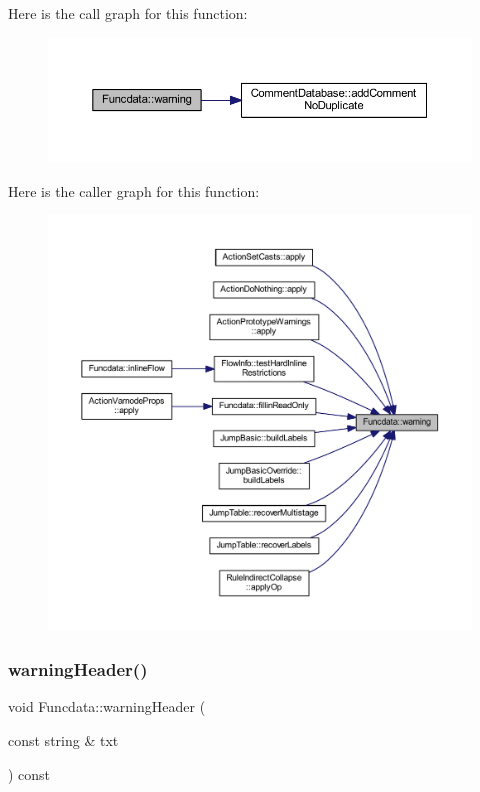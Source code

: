 Here is the call graph for this function\+:
\nopagebreak
\begin{figure}[H]
\begin{center}
\leavevmode
\includegraphics[width=350pt]{class_funcdata_a19698f34a432f84d8cbe94f8e0ad20d4_cgraph}
\end{center}
\end{figure}
Here is the caller graph for this function\+:
\nopagebreak
\begin{figure}[H]
\begin{center}
\leavevmode
\includegraphics[width=350pt]{class_funcdata_a19698f34a432f84d8cbe94f8e0ad20d4_icgraph}
\end{center}
\end{figure}
\mbox{\label{class_funcdata_a87967b12187406a7fdf311cc4b836118}} 
\subsubsection{\texorpdfstring{warningHeader()}{warningHeader()}}
{\footnotesize\ttfamily void Funcdata\+::warning\+Header (\begin{DoxyParamCaption}\item[{const string \&}]{txt }\end{DoxyParamCaption}) const}



